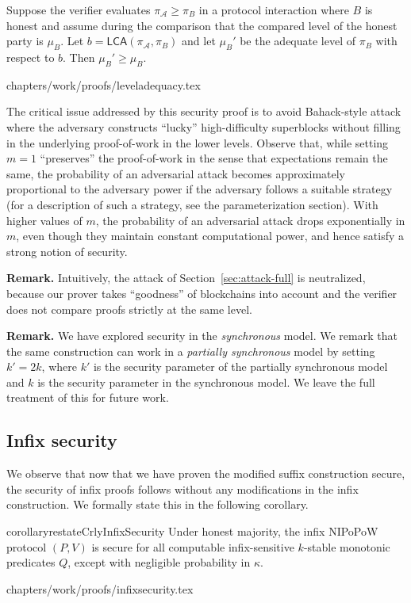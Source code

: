 \begin{lemma}
Suppose the verifier evaluates $\pi_\mathcal{A} \geq \pi_B$ in a protocol
interaction where $B$ is honest and assume during the comparison that the
compared level of the honest party is $\mu_B$. Let $b =
\textsf{LCA}(\pi_\mathcal{A}, \pi_B)$ and let $\mu_B'$ be the adequate
level of $\pi_B$ with respect to $b$. Then $\mu_B' \geq \mu_B$.
\end{lemma}
{chapters/work/proofs/leveladequacy.tex}


\begin{remark}
\label{rmk.variance}
The critical issue addressed by this security proof is to avoid Bahack-style
attack \cite{bahack} where the adversary constructs ``lucky'' high-difficulty
superblocks without filling in the underlying proof-of-work in the lower
levels. Observe that, while setting $m = 1$ ``preserves'' the proof-of-work in
the sense that expectations remain the same, the probability of an adversarial
attack becomes approximately proportional to the adversary power if the
adversary follows a suitable strategy (for a description of such a strategy,
see the parameterization section). With higher values of $m$, the probability of
an adversarial attack drops exponentially in $m$, even though they maintain constant
computational power, and hence satisfy a strong notion of security.
\end{remark}

\noindent\textbf{Remark.}
Intuitively, the attack of Section~\ref{sec:attack-full} is neutralized, because
our prover takes ``goodness'' of blockchains into account and the verifier
does not compare proofs strictly at the same level.

\noindent\textbf{Remark.}
We have explored security in the \emph{synchronous} model. We remark that the
same construction can work in a \emph{partially synchronous} model by setting
$k' = 2k$, where $k'$ is the security parameter of the partially synchronous
model and $k$ is the security parameter in the synchronous model. We leave the
full treatment of this for future work.

\subsection{Infix security}
We observe that now that we have proven the modified suffix construction secure,
the security of infix proofs follows without any modifications in the infix
construction. We formally state this in the following corollary.

\begin{restatable}{corollary}{restateCrlyInfixSecurity}
\label{crly.infix-security}
Under honest majority, the infix NIPoPoW protocol $(P, V)$ is secure for all
computable infix-sensitive $k$-stable monotonic predicates $Q$, except with
negligible probability in $\kappa$.
\end{restatable}
{chapters/work/proofs/infixsecurity.tex}
